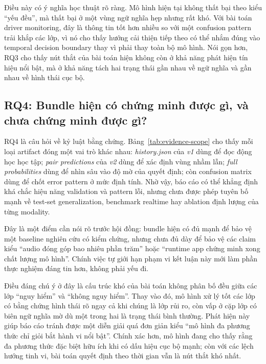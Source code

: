 \documentclass[conference,a4paper]{IEEEtran}
\begin{document}
Điều này có ý nghĩa học thuật rõ ràng. Mô hình hiện tại không thất bại theo kiểu ``yếu đều'', mà thất bại ở một vùng ngữ nghĩa hẹp nhưng rất khó. Với bài toán driver monitoring, đây là thông tin tốt hơn nhiều so với một confusion pattern trải khắp các lớp, vì nó cho thấy hướng cải thiện tiếp theo có thể nhắm đúng vào temporal decision boundary thay vì phải thay toàn bộ mô hình. Nói gọn hơn, RQ3 cho thấy nút thắt của bài toán hiện không còn ở khả năng phát hiện tín hiệu nổi bật, mà ở khả năng tách hai trạng thái gần nhau về ngữ nghĩa và gần nhau về hình thái cục bộ.

\subsection{RQ4: Bundle hiện có chứng minh được gì, và chưa chứng minh được gì?}
RQ4 là câu hỏi về kỷ luật bằng chứng. Bảng~\ref{tab:evidence-scope} cho thấy mỗi loại artifact đóng một vai trò khác nhau: \textit{history.json} của \textit{v1} dùng để đọc động học học tập; \textit{pair predictions} của \textit{v2} dùng để xác định vùng nhầm lẫn; \textit{full probabilities} dùng để nhìn sâu vào độ mờ của quyết định; còn confusion matrix dùng để chốt error pattern ở mức định tính. Nhờ vậy, báo cáo có thể khẳng định khá chắc hiệu năng validation và pattern lỗi, nhưng chưa được phép tuyên bố mạnh về test-set generalization, benchmark realtime hay ablation định lượng của từng modality.

Đây là một điểm cần nói rõ trước hội đồng: bundle hiện có đủ mạnh để bảo vệ một baseline nghiên cứu có kiểm chứng, nhưng chưa đủ dày để bảo vệ các claim kiểu ``audio đóng góp bao nhiêu phần trăm'' hoặc ``runtime app chứng minh xong chất lượng mô hình''. Chính việc tự giới hạn phạm vi kết luận này mới làm phần thực nghiệm đáng tin hơn, không phải yếu đi.

Điều đáng chú ý ở đây là cấu trúc khó của bài toán không phân bố đều giữa các lớp ``nguy hiểm'' và ``không nguy hiểm''. Thay vào đó, mô hình xử lý tốt các lớp có bằng chứng hình thái rõ ngay cả khi chúng là lớp rủi ro, còn vấp ở cặp lớp có biên ngữ nghĩa mờ dù một trong hai là trạng thái bình thường. Phát hiện này giúp báo cáo tránh được một diễn giải quá đơn giản kiểu ``mô hình đa phương thức chỉ giỏi bắt hành vi nổi bật''. Chính xác hơn, mô hình đang cho thấy rằng đa phương thức đặc biệt hữu ích khi có dấu hiệu cục bộ mạnh; còn với các lệch hướng tinh vi, bài toán quyết định theo thời gian vẫn là nút thắt khó nhất.
\end{document}

